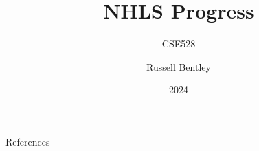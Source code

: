 \documentclass{beamer}
\title{NHLS Progress}
\subtitle{CSE528}
\author{Russell Bentley}
\institute{Stony Brook}
\date{2024}
\begin{document}
\frame{\titlepage}







\begin{frame}[allowframebreaks]{References}
    \tiny
    \printbibliography
\end{frame}
\end{document}
